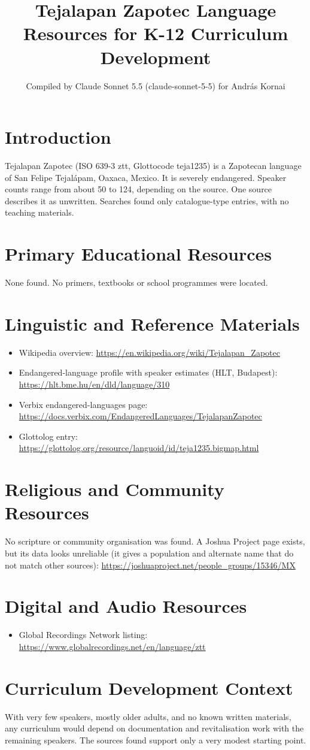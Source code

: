 \documentclass[12pt]{article}
\title{Tejalapan Zapotec Language Resources for K-12 Curriculum Development}
\author{Compiled by Claude Sonnet 5.5 (claude-sonnet-5-5) for Andr\'as Kornai}
\date{}
\begin{document}
\maketitle

\section{Introduction}
Tejalapan Zapotec (ISO 639-3 ztt, Glottocode teja1235) is a Zapotecan language of San Felipe Tejal\'apam, Oaxaca, Mexico. It is severely endangered. Speaker counts range from about 50 to 124, depending on the source. One source describes it as unwritten. Searches found only catalogue-type entries, with no teaching materials.

\section{Primary Educational Resources}
None found. No primers, textbooks or school programmes were located.

\section{Linguistic and Reference Materials}
\begin{itemize}
\item Wikipedia overview: \url{https://en.wikipedia.org/wiki/Tejalapan_Zapotec}
\item Endangered-language profile with speaker estimates (HLT, Budapest): \url{https://hlt.bme.hu/en/dld/language/310}
\item Verbix endangered-languages page: \url{https://docs.verbix.com/EndangeredLanguages/TejalapanZapotec}
\item Glottolog entry: \url{https://glottolog.org/resource/languoid/id/teja1235.bigmap.html}
\end{itemize}

\section{Religious and Community Resources}
No scripture or community organisation was found. A Joshua Project page exists, but its data looks unreliable (it gives a population and alternate name that do not match other sources): \url{https://joshuaproject.net/people_groups/15346/MX}

\section{Digital and Audio Resources}
\begin{itemize}
\item Global Recordings Network listing: \url{https://www.globalrecordings.net/en/language/ztt}
\end{itemize}

\section{Curriculum Development Context}
With very few speakers, mostly older adults, and no known written materials, any curriculum would depend on documentation and revitalisation work with the remaining speakers. The sources found support only a very modest starting point.
\end{document}

